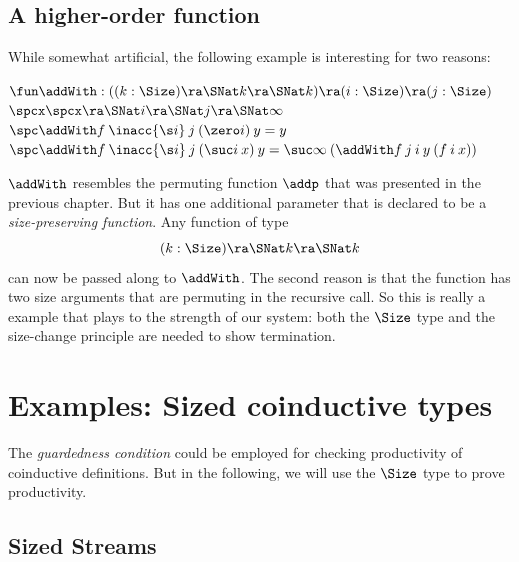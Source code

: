 \subsection{A higher-order function}
While somewhat artificial, the following example is interesting for two reasons:
\begin{bsp}
$\fun \addWith : ((k : \Size ) \ra \SNat k \ra \SNat k ) \ra (i : \Size ) \ra (j : \Size ) $\\
$\spcx \spcx \ra  \SNat i \ra \SNat j \ra \SNat \infty $\\
$\spc \addWith f \: \inacc{\s i} \: j \: (\zero i) \: y = y $ \\
$\spc \addWith f \: \inacc{\s i} \: j \: (\suc i \: x) \: y = \suc \infty \: (\addWith f \: j \: i \: y \: (f \: i \: x))$
\end{bsp}
$\addWith$ resembles the permuting function $\addp$ that was presented in the previous chapter.
But it has one additional parameter that is declared to be a \emph{size-preserving function}. 
Any function of type 
\[ (k : \Size ) \ra \SNat k \ra \SNat k \]
can now be passed along to $\addWith$.
The second reason is that the function has two size arguments that are permuting in the recursive call. 
So this is really a example that plays to the strength of our system: both the $\Size$ type and the size-change principle are needed to show termination.

\section{Examples: Sized coinductive types}

The \emph{guardedness condition} \cite{coquand-infinite} could be employed for checking productivity of coinductive definitions. But in the following, we will use the $\Size$ type to prove productivity.

\subsection{Sized Streams}

